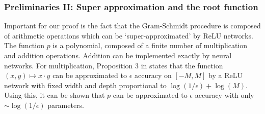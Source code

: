 \documentclass[twoside,11pt]{article}
\begin{document}
\subsubsection{Preliminaries II: Super approximation and the root function}
Important for our proof is the fact that the Gram-Schmidt procedure is composed of arithmetic operations which can be `super-approximated' by ReLU networks. The function $p$ is a polynomial, composed of a finite number of multiplication and addition operations. Addition can be implemented exactly by neural networks. For multiplication, Proposition 3 in \cite{yarotsky2017error} states that the function $(x,y)\mapsto x\cdot y $ can be approximated to $\epsilon$ accuracy on $[-M,M]$ by a ReLU network with fixed width and depth proportional to $\log(1/\epsilon)+\log(M)$. Using this, it can be shown that $p$ can be approximated to $\epsilon$ accuracy with only $\sim \log(1/\epsilon)$ parameters.
\end{document}

